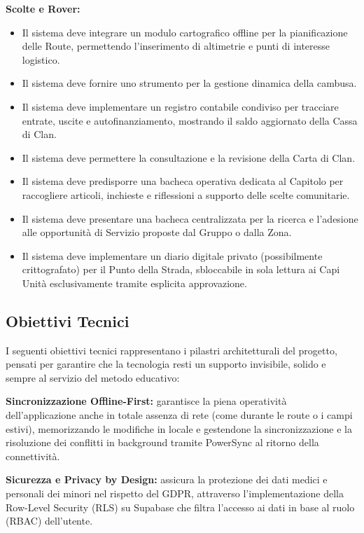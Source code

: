 \documentclass[11pt]{article}
\numberwithin{figure}{section}
\begin{document}
\textbf{Scolte e Rover:}
\begin{itemize}[topsep=0pt]
  \item Il sistema deve integrare un modulo cartografico offline per la pianificazione delle Route, permettendo l'inserimento di altimetrie e punti di interesse logistico.
  \item Il sistema deve fornire uno strumento per la gestione dinamica della cambusa.
  \item Il sistema deve implementare un registro contabile condiviso per tracciare entrate, uscite e autofinanziamento, mostrando il saldo aggiornato della Cassa di Clan.
  \item Il sistema deve permettere la consultazione e la revisione della Carta di Clan.
  \item Il sistema deve predisporre una bacheca operativa dedicata al Capitolo per raccogliere articoli, inchieste e riflessioni a supporto delle scelte comunitarie.
  \item Il sistema deve presentare una bacheca centralizzata per la ricerca e l'adesione alle opportunità di Servizio proposte dal Gruppo o dalla Zona.
  \item Il sistema deve implementare un diario digitale privato (possibilmente crittografato) per il Punto della Strada, sbloccabile in sola lettura ai Capi Unità esclusivamente tramite esplicita approvazione.
\end{itemize}

\subsection{Obiettivi Tecnici}
I seguenti obiettivi tecnici rappresentano i pilastri architetturali del progetto, pensati per garantire che la tecnologia resti un supporto invisibile, solido e sempre al servizio del metodo educativo:

\textbf{Sincronizzazione Offline-First:} garantisce la piena operatività dell'applicazione anche in totale assenza di rete (come durante le route o i campi estivi), memorizzando le modifiche in locale e gestendone la sincronizzazione e la risoluzione dei conflitti in background tramite PowerSync al ritorno della connettività.

\textbf{Sicurezza e Privacy by Design:} assicura la protezione dei dati medici e personali dei minori nel rispetto del GDPR, attraverso l'implementazione della Row-Level Security (RLS) su Supabase che filtra l'accesso ai dati in base al ruolo (RBAC) dell'utente.
\end{document}
